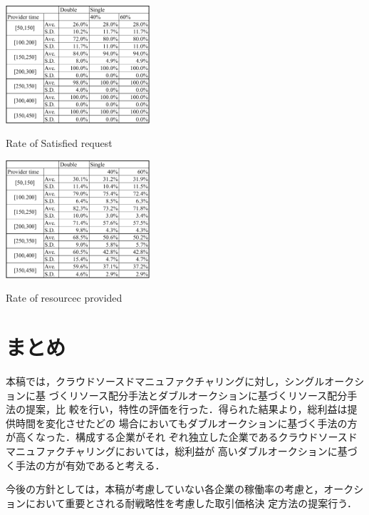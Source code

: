 \documentclass{ujarticle}
\begin{document}
\begin{table}[H]
  \centering
  \includegraphics[width=0.4\textwidth]{request_rate.pdf} 
  \caption{Rate of Satisfied request}
  \label{tab:request_rate}
\end{table}

\begin{table}[H]
  \centering
  \includegraphics[width=0.4\textwidth]{provide_rate.pdf} 
  \caption{Rate of resourcec provided}
  \label{tab:provide_rate}
\end{table}

\section{まとめ}
本稿では，クラウドソースドマニュファクチャリングに対し，シングルオークションに基
づくリソース配分手法とダブルオークションに基づくリソース配分手法の提案，比
較を行い，特性の評価を行った．得られた結果より，総利益は提供時間を変化させたどの
場合においてもダブルオークションに基づく手法の方が高くなった．構成する企業がそれ
ぞれ独立した企業であるクラウドソースドマニュファクチャリングにおいては，総利益が
高いダブルオークションに基づく手法の方が有効であると考える．\par
今後の方針としては，本稿が考慮していない各企業の稼働率の考慮と，オークションにおいて重要とされる耐戦略性を考慮した取引価格決
定方法の提案行う．
 

\end{document}
